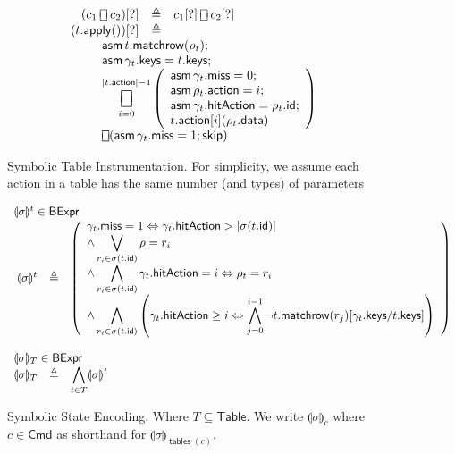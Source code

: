 \documentclass{article}
\newcommand{\BExpr}{\mathsf{BExpr}}
\newcommand{\Cmd}{\mathsf{Cmd}}
\newcommand{\Table}{\mathsf{Table}}
\newcommand{\action}{\mathsf{action}}
\newcommand{\keys}{\mathsf{keys}}
\newcommand{\data}{\mathsf{data}}
\newcommand{\id}{\mathsf{id}}
\newcommand{\hitAction}{\mathsf{hitAction}}
\newcommand{\miss}{\mathsf{miss}}
\newcommand{\assume}{\mathop{\mathsf{asm}}}
\newcommand{\apply}{\mathsf{apply}}
\newcommand{\choiceop}{\rotatebox[origin=c]{90}{$\sqsubset\!\!\!\sqsupset$}}
\newcommand{\choice}{\mathbin{\choiceop}}
\DeclareMathOperator*{\bigchoice}{\scalerel*{\choiceop}{\sum}}
\newcommand{\SKIP}{\mathsf{skip}}
\newcommand{\state}[1]{\llparenthesis#1\rrparenthesis}
\newcommand{\instr}{[?]}
\newcommand{\matchrow}{\mathsf{matchrow}}
\newcommand{\tables}{\mathop{\mathsf{tables}}}
\theoremstyle{plain}
\theoremstyle{definition}
\theoremstyle{remark}
\begin{document}
\begin{figure}[htp]
\[\begin{array}{r >{\triangleq}cl}
  (c_1 \choice c_2)\instr && c_1\instr \choice c_2\instr\\
  (t.\apply())\instr &&\\
  \multicolumn{3}{l}{
    \qquad
    \begin{array}[t]{l} \displaystyle
      \assume t.\matchrow(\rho_t); \\
      \assume \gamma_t.\keys = t.\keys; \\
    \displaystyle \bigchoice_{i=0}^{|t.\action| -1}
    \left(\begin{array}{l}
      \assume \gamma_t.\miss = 0;\\
      \assume \rho_t.\action = i;\\
      \assume \gamma_t.\hitAction = \rho_t.\id;\\
      t.\action[i](\rho_t.\data)
    \end{array}\right)\\
    \choice (\assume \gamma_t.\miss = 1; \SKIP)  \\
  \end{array}}
  \end{array}
  \]
  \caption{Symbolic Table Instrumentation. For simplicity, we
    assume each action in a table has the same number (and types) of parameters}
  \label{fig:table-instrument}
\end{figure}

\begin{figure}[htp]
  \[\begin{array}{r cl}
  \multicolumn{3}{l}{\state\sigma^t \in \BExpr} \\
  \state\sigma^t & \triangleq &
  \left(\begin{array}{>{\displaystyle}l}
  \gamma_t.\miss = 1 \Leftrightarrow \gamma_t.\hitAction > |\sigma(t.\id)| \\
  \wedge \bigvee_{r_i \in \sigma(t.\id)} \rho = r_i  \\
  \wedge \bigwedge_{r_i \in \sigma(t.\id)} \gamma_t.\hitAction = i \Leftrightarrow \rho_t = r_i \\
  \wedge \bigwedge_{r_i \in \sigma(t.\id)} \left(\gamma_t.\hitAction \geq i \Leftrightarrow \bigwedge_{j=0}^{i-1} \neg t.\matchrow(r_j)[\gamma_t.\keys/t.\keys]\right)\\
  \end{array}\right)\\\\

  \multicolumn{3}{l}{\state\sigma_T \in \BExpr} \\
  \state\sigma_T &\triangleq
  & \displaystyle\bigwedge_{ t \in T } \state\sigma^t
  \end{array}
  \]
  \caption{Symbolic State Encoding. Where $T \subseteq \Table$. We write
    $\state\sigma_c$ where $c \in \Cmd$ as shorthand for $\state\sigma_{\tables(c)}$.}
  \label{fig:state-encode}
\end{figure}
\end{document}
